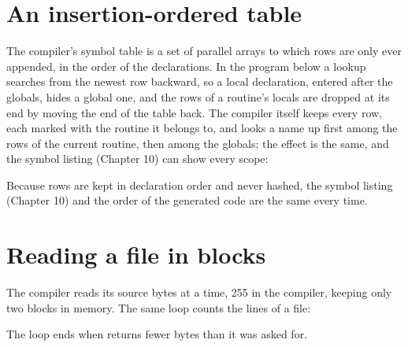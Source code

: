 

\section{An insertion-ordered table}
The compiler's symbol table is a set of parallel arrays to which rows are
only ever appended, in the order of the declarations.  In the program
below a lookup searches from the newest row backward, so a local
declaration, entered after the globals, hides a global one, and the rows of
a routine's locals are dropped at its end by moving the end of the table
back.  The compiler itself keeps every row, each marked with the routine it
belongs to, and looks a name up first among the rows of the current
routine, then among the globals; the effect is the same, and the symbol
listing (Chapter 10) can show every scope:



Because rows are kept in declaration order and never hashed, the symbol
listing (Chapter 10) and the order of the generated code are the same every
time.

\section{Reading a file in blocks}
The compiler reads its source  bytes at a time, 255 in the
compiler, keeping only two blocks in memory.  The same loop counts the lines
of a file:



The loop ends when  returns fewer bytes than it
was asked for.
